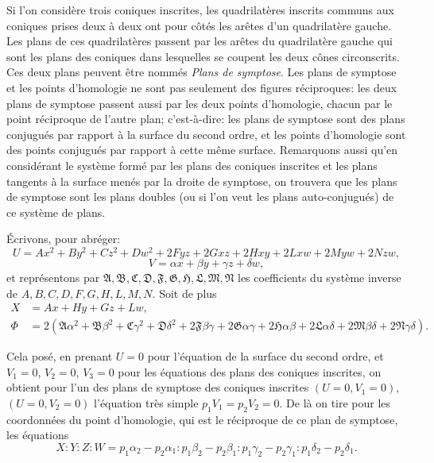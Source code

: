 \documentclass[11pt,a4paper]{book}
\begin{document}
Si l'on consid\`{e}re trois coniques inscrites, les quadrilat\`{e}res inscrits communs aux coniques prises deux \`{a} deux ont pour c\^{o}t\'{e}s les ar\^{e}tes d'un quadrilat\`{e}re gauche. Les plans de ces quadrilat\`{e}res passent par les ar\^{e}tes du quadrilat\`{e}re gauche qui sont les plans des coniques dans lesquelles se coupent les deux c\^{o}nes circonscrits. Ces deux plans peuvent \^{e}tre nomm\'{e}s \emph{Plans de symptose}. Les plans de symptose et les points d'homologie ne sont pas seulement des figures r\'{e}ciproques: les deux plans de symptose passent aussi par les deux points d'homologie, chacun par le point r\'{e}ciproque de l'autre plan; c'est-\`{a}-dire: les plans de symptose sont des plans conjugu\'{e}s par rapport \`{a} la surface du second ordre, et les points d'homologie sont des points conjugu\'{e}s par rapport \`{a} cette m\^{e}me surface. Remarquons aussi qu'en consid\'{e}rant le syst\`{e}me form\'{e} par les plans des coniques inscrites et les plans tangents \`{a} la surface men\'{e}s par la droite de symptose, on trouvera que les plans de symptose sont les plans doubles (ou si l'on veut les plans auto-conjugu\'{e}s) de ce syst\`{e}me de plans.


\'{E}crivons, pour abr\'{e}ger:
\[
U = Ax^2 + By^2 + Cz^2 + Dw^2 + 2Fyz + 2Gxz + 2Hxy + 2Lxw + 2Myw + 2Nzw,
\]
\[
V = \alpha x + \beta y + \gamma z + \delta w,
\]
et repr\'{e}sentons par $\mathfrak{A}, \mathfrak{B}, \mathfrak{C}, \mathfrak{D}, \mathfrak{F}, \mathfrak{G}, \mathfrak{H}, \mathfrak{L}, \mathfrak{M}, \mathfrak{N}$ les coefficients du syst\`{e}me inverse de $A, B, C, D, F, G, H, L, M, N$. Soit de plus
\begin{align*}
X &= Ax + Hy + Gz + Lw, \\
\Phi &= 2(\mathfrak{A}\alpha^2 + \mathfrak{B}\beta^2 + \mathfrak{C}\gamma^2 + \mathfrak{D}\delta^2 + 2\mathfrak{F}\beta\gamma + 2\mathfrak{G}\alpha\gamma + 2\mathfrak{H}\alpha\beta + 2\mathfrak{L}\alpha\delta + 2\mathfrak{M}\beta\delta + 2\mathfrak{N}\gamma\delta).
\end{align*}

Cela pos\'{e}, en prenant $U = 0$ pour l'\'{e}quation de la surface du second ordre, et $V_1 = 0$, $V_2 = 0$, $V_3 = 0$ pour les \'{e}quations des plans des coniques inscrites, on obtient pour l'un des plans de symptose des coniques inscrites $(U = 0, V_1 = 0)$, $(U = 0, V_2 = 0)$ l'\'{e}quation tr\`{e}s simple $p_1 V_1 = p_2 V_2 = 0$. De l\`{a} on tire pour les coordonn\'{e}es du point d'homologie, qui est le r\'{e}ciproque de ce plan de symptose, les \'{e}quations
\[
X : Y : Z : W = p_1 \alpha_2 - p_2 \alpha_1 : p_1 \beta_2 - p_2 \beta_1 : p_1 \gamma_2 - p_2 \gamma_1 : p_1 \delta_2 - p_2 \delta_1.
\]
\end{document}
